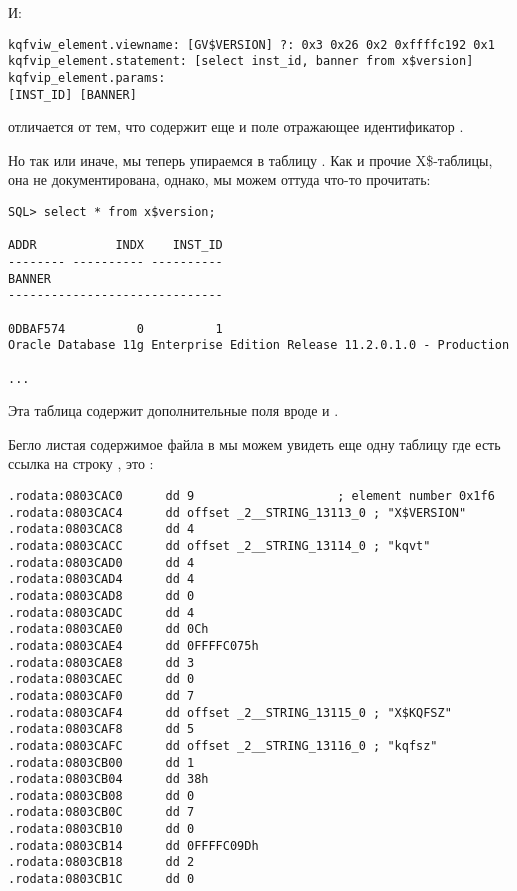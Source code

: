 И:

\begin{lstlisting}[caption=Результат работы \OracleTablesName]
kqfviw_element.viewname: [GV$VERSION] ?: 0x3 0x26 0x2 0xffffc192 0x1
kqfvip_element.statement: [select inst_id, banner from x$version]
kqfvip_element.params:
[INST_ID] [BANNER] 
\end{lstlisting}

  отличается от  тем, что содержит еще и поле отражающее идентификатор .

Но так или иначе, мы теперь упираемся в таблицу . Как и прочие X\$-таблицы, она не документирована, однако, мы можем оттуда что-то прочитать:

\begin{lstlisting}
SQL> select * from x$version;

ADDR           INDX    INST_ID
-------- ---------- ----------
BANNER
------------------------------

0DBAF574          0          1
Oracle Database 11g Enterprise Edition Release 11.2.0.1.0 - Production

...
\end{lstlisting}

Эта таблица содержит дополнительные поля вроде  и .

Бегло листая содержимое файла  в \IDA мы можем увидеть еще одну таблицу где есть ссылка на строку , это :

\begin{lstlisting}[caption=kqf.o]
.rodata:0803CAC0      dd 9                    ; element number 0x1f6
.rodata:0803CAC4      dd offset _2__STRING_13113_0 ; "X$VERSION"
.rodata:0803CAC8      dd 4
.rodata:0803CACC      dd offset _2__STRING_13114_0 ; "kqvt"
.rodata:0803CAD0      dd 4
.rodata:0803CAD4      dd 4
.rodata:0803CAD8      dd 0
.rodata:0803CADC      dd 4
.rodata:0803CAE0      dd 0Ch
.rodata:0803CAE4      dd 0FFFFC075h
.rodata:0803CAE8      dd 3
.rodata:0803CAEC      dd 0
.rodata:0803CAF0      dd 7
.rodata:0803CAF4      dd offset _2__STRING_13115_0 ; "X$KQFSZ"
.rodata:0803CAF8      dd 5
.rodata:0803CAFC      dd offset _2__STRING_13116_0 ; "kqfsz"
.rodata:0803CB00      dd 1
.rodata:0803CB04      dd 38h
.rodata:0803CB08      dd 0
.rodata:0803CB0C      dd 7
.rodata:0803CB10      dd 0
.rodata:0803CB14      dd 0FFFFC09Dh
.rodata:0803CB18      dd 2
.rodata:0803CB1C      dd 0
\end{lstlisting}


